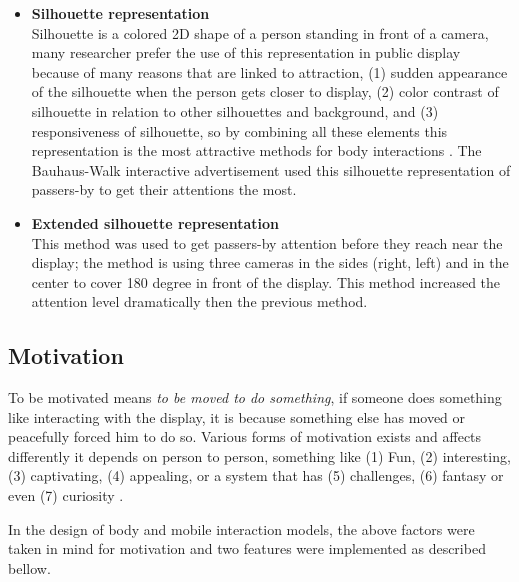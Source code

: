 \begin{itemize}

\item \textbf{Silhouette representation} \\
Silhouette is a colored 2D shape of a person standing in front of a camera, many researcher prefer the use of this representation in public display because of many reasons that are linked to attraction, (1) sudden appearance of the silhouette when the person gets closer to display, (2) color contrast of silhouette in relation to other silhouettes and background, and (3) responsiveness of silhouette, so by combining all these elements this representation is the most attractive methods for body interactions \cite{LookingGlass}. The Bauhaus-Walk interactive advertisement used this silhouette representation of passers-by to get their attentions the most.


\item \textbf{Extended silhouette representation} \\
This method was used to get passers-by attention before they reach near the display; the method is using three cameras in the sides (right, left) and in the center to cover 180 degree in front of the display. This method increased the attention level dramatically then the previous method.


\end{itemize}

\subsection{Motivation}
To be motivated means \emph{to be moved to do something}\cite{motiv}, if someone does something like interacting with the display, it is because something else has moved or peacefully forced him to do so. Various forms of motivation exists and affects differently it depends on person to person, something like (1) Fun, (2) interesting, (3) captivating, (4) appealing, or a system that has (5) challenges, (6) fantasy or even (7) curiosity \cite{ toward_motivation}.

In the design of body and mobile interaction models, the above factors were taken in mind for motivation and two features were implemented as described bellow.

